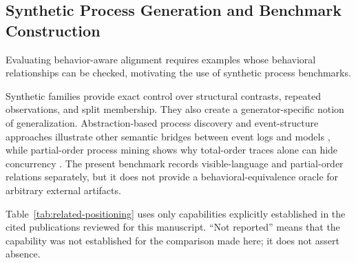 \documentclass[mathematics,article,submit,moreauthors]{Definitions/mdpi}
\begin{document}
\subsection{Synthetic Process Generation and Benchmark Construction}

Evaluating behavior-aware alignment requires examples whose behavioral relationships can be checked, motivating the use of synthetic process benchmarks.

Synthetic families provide exact control over structural contrasts, repeated observations, and split membership. They also create a generator-specific notion of generalization. Abstraction-based process discovery and event-structure approaches illustrate other semantic bridges between event logs and models \cite{vanDerAalst2018Abstractions,Dumas2015EventStructures}, while partial-order process mining shows why total-order traces alone can hide concurrency \cite{Leemans2023PartialOrderSurvey}. The present benchmark records visible-language and partial-order relations separately, but it does not provide a behavioral-equivalence oracle for arbitrary external artifacts.

Table~\ref{tab:related-positioning} uses only capabilities explicitly established in the cited publications reviewed for this manuscript. ``Not reported'' means that the capability was not established for the comparison made here; it does not assert absence.
\end{document}
